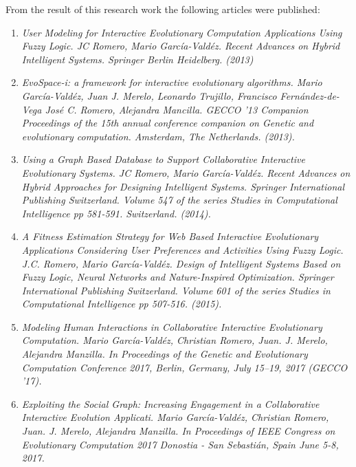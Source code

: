 From the result of this research work the following articles were published:
\begin{enumerate} \item \textit{User Modeling for Interactive Evolutionary
Computation Applications Using Fuzzy Logic. JC Romero, Mario Garc\'ia-Vald\'ez.
Recent Advances on Hybrid Intelligent Systems. Springer Berlin Heidelberg.
(2013)} \item \textit{ EvoSpace-i: a framework for interactive evolutionary
algorithms. Mario Garc\'ia-Vald\'ez, 	Juan J. Merelo, 	Leonardo Trujillo,
Francisco Fernández-de-Vega Jos\'e C. Romero, 	Alejandra Mancilla. GECCO '13
Companion Proceedings of the 15th annual conference  companion on Genetic and
evolutionary computation. Amsterdam, The Netherlands. (2013).} \item
\textit{Using a Graph Based Database to Support Collaborative Interactive
Evolutionary Systems.  JC Romero, Mario Garc\'ia-Vald\'ez. Recent Advances on
Hybrid Approaches for Designing Intelligent Systems. Springer International
Publishing Switzerland. Volume 547 of the series Studies in Computational
Intelligence pp 581-591. Switzerland. (2014).} \item \textit{A Fitness
Estimation Strategy for Web Based Interactive Evolutionary Applications
Considering User Preferences and Activities Using Fuzzy Logic. J.C. Romero,
Mario Garc\'ia-Vald\'ez. Design of Intelligent Systems Based on Fuzzy Logic,
Neural Networks and Nature-Inspired Optimization. Springer International
Publishing Switzerland. Volume 601 of the series Studies in Computational
Intelligence pp 507-516. (2015).}
\item \textit{Modeling Human Interactions in
Collaborative Interactive Evolutionary Computation.  Mario Garc\'ia-Vald\'ez,
Christian Romero, Juan. J. Merelo, Alejandra Manzilla.  In Proceedings of the Genetic and Evolutionary Computation
Conference 2017, Berlin, Germany, July 15–19, 2017 (GECCO ’17).}
\item \textit{Exploiting the Social Graph: Increasing Engagement in a Collaborative Interactive Evolution Applicati.
Mario Garc\'ia-Vald\'ez,
Christian Romero, Juan. J. Merelo, Alejandra Manzilla.  In Proceedings of IEEE Congress on Evolutionary Computation 2017
Donostia - San Sebastián, Spain
June 5-8, 2017.}

\end{enumerate}

